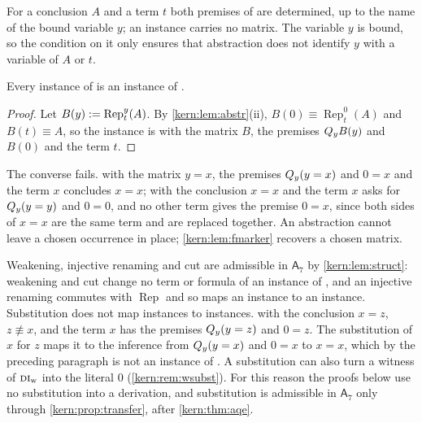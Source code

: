 For a conclusion $A$ and a term $t$ both premises of  are
determined, up to the name of the bound variable $y$; an instance carries no
matrix.  The variable $y$ is bound, so the condition on it only ensures that
abstraction does not identify $y$ with a variable of $A$ or $t$.

\begin{lemma}
\label{kern:lem:aqesound}
Every instance of  is an instance of .
\end{lemma}

\begin{proof}
Let $B(y)\mathrel{:=}\operatorname{Rep}_{t}^{y}(A)$.  By
\cref{kern:lem:abstr}(ii), $B(0)\equiv\operatorname{Rep}_{t}^{0}(A)$ and
$B(t)\equiv A$, so the instance is  with the matrix $B$, the
premises $Q_{y}B(y)$ and $B(0)$ and the term $t$.
\end{proof}

The converse fails.   with the matrix $y=x$, the premises
$Q_{y}(y=x)$ and $0=x$ and the term $x$ concludes $x=x$;  with
the conclusion $x=x$ and the term $x$ asks for $Q_{y}(y=y)$ and $0=0$, and no
other term gives the premise $0=x$, since both sides of $x=x$ are the same
term and are replaced together.  An abstraction cannot leave a chosen
occurrence in place; \cref{kern:lem:fmarker} recovers a chosen matrix.

\begin{remark}
\label{kern:rem:aqesubst}
Weakening, injective renaming and cut are admissible in $\mathsf{A}_7$ by
\cref{kern:lem:struct}: weakening and cut change no term or formula of an
instance of , and an injective renaming commutes with
$\operatorname{Rep}$ and so maps an instance to an instance.  Substitution does not map instances to
instances.   with the conclusion $x=z$, $z\not\equiv x$, and
the term $x$ has the premises $Q_{y}(y=z)$ and $0=z$.  The substitution of
$x$ for $z$ maps it to the inference from $Q_{y}(y=x)$ and $0=x$ to $x=x$,
which by the preceding paragraph is not an instance of .  A
substitution can also turn a witness of $\rulename{DI}_{\mathrm{w}}$ into the
literal $0$ (\cref{kern:rem:wsubst}).  For this reason the proofs below use
no substitution into a derivation, and substitution is admissible in
$\mathsf{A}_7$ only through \cref{kern:prop:transfer}, after
\cref{kern:thm:aqe}.
\end{remark}

